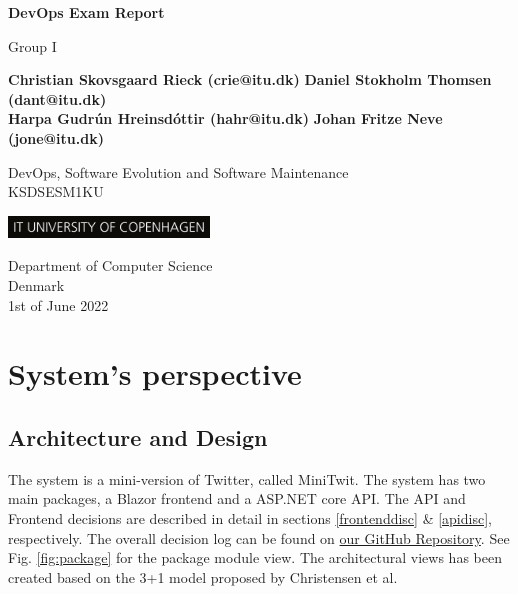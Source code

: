 \documentclass[10pt]{article}
\newcommand{\frontmatter}{\clearpage \cfoot{\thepage\ }
\fancyhead{}
\renewcommand{\headrulewidth}{0pt}
\setcounter{page}{1}
\pagenumbering{Roman}}
\newcommand{\mainmatter}{\clearpage \cfoot{\thepage\ of \pageref{LastPage}}
\fancyhead[LE,RO]{Group I}\fancyhead[RE,LO]{\leftmark}
\renewcommand{\headrulewidth}{0.4pt}
\setcounter{page}{1}
\pagenumbering{arabic}}
\begin{document}
\begin{titlepage}
    \begin{center}
        \vspace*{1cm}

        \Huge
        \textbf{DevOps Exam Report}
        
        \vspace{0.5cm}
        
        \Large
        Group I
            
        \vspace{1.5cm}
         
        \textbf{Christian Skovsgaard Rieck (crie@itu.dk)}
        \textbf{Daniel Stokholm Thomsen (dant@itu.dk)}\\
        \textbf{Harpa Gudrún Hreinsdóttir (hahr@itu.dk)}
        \textbf{Johan Fritze Neve (jone@itu.dk)}
            
        \vspace{1.5cm}
        
       
            
        \vfill
            
        DevOps, Software Evolution and Software Maintenance\\
         KSDSESM1KU
            
        \vspace{0.8cm}
            
        \includegraphics[width=0.4\textwidth]{images/ITU_logo_UK jpg.jpg}
            
        \Large
        Department of Computer Science\\
        Denmark\\
        1st of June 2022
            
    \end{center}
\end{titlepage}

\frontmatter
\tableofcontents

\mainmatter

\section{System's perspective}
\subsection{Architecture and Design}
The system is a mini-version of Twitter, called MiniTwit.
The system has two main packages, a Blazor frontend and a ASP.NET core API. The API and Frontend decisions are described in detail in sections \ref{frontenddisc} \& \ref{apidisc}, respectively. The overall decision log can be found on \href{https://github.com/Arklaide/devopsITUproject/blob/main/report/sub-reports/decision_log.md}{our GitHub Repository}. See Fig. \ref{fig:package} for the package module view. The architectural views has been created based on the 3+1 model proposed by Christensen et al\cite{christensen20163+}.
\end{document}
